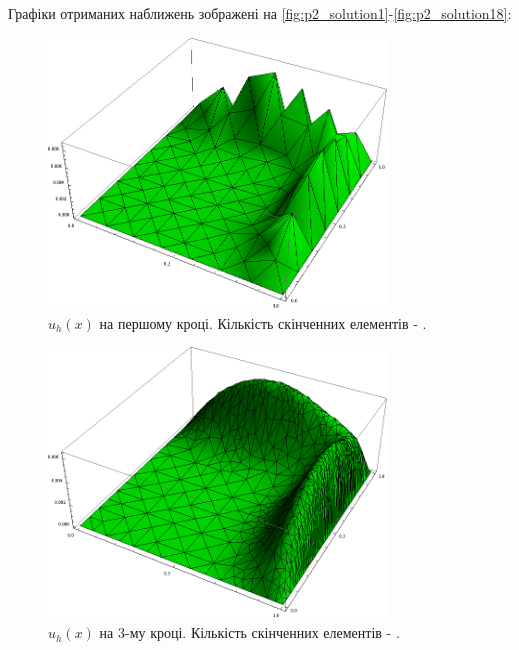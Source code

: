 Графіки отриманих наближень зображені на \autoref{fig:p2_solution1}-\ref{fig:p2_solution18}:
%
\begin{figure}[H]
	\centering
    \includegraphics[width=0.8\textwidth]{problem2/my/solutions/solution1}
    \caption{$u_h(x)$ на першому кроці. Кількість скінченних елементів - .}
    \label{fig:p2_solution1}
\end{figure}
%
\begin{figure}[H]
	\centering
    \includegraphics[width=0.8\textwidth]{problem2/my/solutions/solution3}
    \caption{$u_h(x)$ на 3-му кроці. Кількість скінченних елементів - .}
    \label{fig:p2_solution3}
\end{figure}
%
